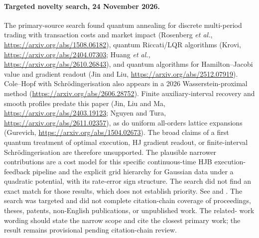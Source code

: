 \documentclass[11pt,a4paper]{article}
\begin{document}
\paragraph{Targeted novelty search, 24 November 2026.}
The primary-source search found quantum annealing for discrete multi-period
trading with transaction costs and market impact (Rosenberg \emph{et al.},
\url{https://arxiv.org/abs/1508.06182}), quantum Riccati/LQR algorithms
(Krovi, \url{https://arxiv.org/abs/2404.07303}; Huang \emph{et al.},
\url{https://arxiv.org/abs/2610.26843}), and quantum algorithms for
Hamilton--Jacobi value and gradient readout (Jin and Liu,
\url{https://arxiv.org/abs/2512.07919}). Cole--Hopf with
Schr\"odingerisation also appears in a 2026 Wasserstein-proximal method
(\url{https://arxiv.org/abs/2606.28752}). Finite auxiliary-interval recovery
and smooth profiles predate this paper (Jin, Liu and Ma,
\url{https://arxiv.org/abs/2403.19123}; Nguyen and Tura,
\url{https://arxiv.org/abs/2611.02357}), as do uniform all-orders lattice
expansions (Gurevich, \url{https://arxiv.org/abs/1504.02673}). The broad
claims of a first quantum treatment of optimal execution, HJ gradient
readout, or finite-interval Schr\"odingerisation are therefore unsupported.
The plausible narrower contributions are a cost model for this specific
continuous-time HJB execution-feedback pipeline and the explicit grid
hierarchy for Gaussian data under a quadratic potential, with its rate-error
sign structure. The
search did not find an exact match for those results, which does not establish
priority. See 
and . The search was
targeted and did not complete citation-chain coverage of proceedings,
theses, patents, non-English publications, or unpublished work. The related-
work wording should state the narrow scope and cite the closest primary work;
the result remains provisional pending citation-chain review.
\end{document}
